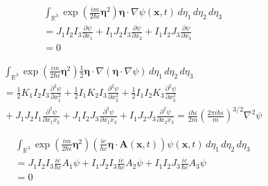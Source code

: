 \documentclass[12pt]{article}
\newcommand\INT{\int_{\mathbb R^3}}
\begin{document}
\begin{align*}
&
\INT\exp\left(\frac{im}{2\hbar\epsilon}\boldsymbol\eta^2\right)
\boldsymbol\eta\cdot\nabla\psi(\mathbf x,t)
\,d\eta_1\,d\eta_2\,d\eta_3
\\
&{}
=J_1 I_2 I_3 \frac{\partial\psi}{\partial x_1}
+I_1 J_2 I_3 \frac{\partial\psi}{\partial x_2}
+I_1 I_2 J_3 \frac{\partial\psi}{\partial x_3}
\\
&{}
=0
\tag{8}
\end{align*}

\begin{align*}
&\INT\exp\left(\frac{im}{2\hbar\epsilon}\boldsymbol\eta^2\right)
\tfrac{1}{2}\boldsymbol\eta\cdot\nabla(\boldsymbol\eta\cdot\nabla\psi)
\,d\eta_1\,d\eta_2\,d\eta_3
\\
&{}
=\tfrac{1}{2}K_1 I_2 I_3 \frac{\partial^2\psi}{\partial x_1^2}
+\tfrac{1}{2}I_1 K_2 I_3 \frac{\partial^2\psi}{\partial x_2^2}
+\tfrac{1}{2}I_1 I_2 K_3 \frac{\partial^2\psi}{\partial x_3^2}
\\
&{}
+J_1 J_2 I_1 \frac{\partial^2\psi}{\partial x_1 x_2}
+J_1 I_2 J_3 \frac{\partial^2\psi}{\partial x_1 x_3}
+I_1 J_2 J_3 \frac{\partial^2\psi}{\partial x_2 x_3}
=\frac{i\hbar\epsilon}{2m}\left(\frac{2\pi i\hbar\epsilon}{m}\right)^{3/2}\nabla^2\psi
\tag{9}
\end{align*}

\begin{align*}
&
\INT
\exp\left(\frac{im}{2\hbar\epsilon}\boldsymbol\eta^2\right)
\left(\frac{ie}{\hbar c}\boldsymbol\eta\cdot\mathbf A(\mathbf x,t)\right)
\psi(\mathbf x,t)
\,d\eta_1\,d\eta_2\,d\eta_3
\\
&{}
=J_1 I_2 I_3 \frac{ie}{\hbar c} A_1 \psi
+I_1 J_2 I_3 \frac{ie}{\hbar c} A_2 \psi
+I_1 I_2 J_3 \frac{ie}{\hbar c} A_3 \psi
\\
&{}
=0
\tag{10}
\end{align*}
\end{document}
